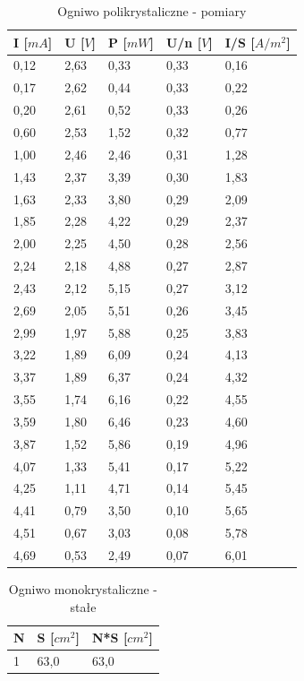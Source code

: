 \documentclass[12pt,a4paper]{article}
\begin{document}
\begin{table}[H]
\centering
\caption{Ogniwo polikrystaliczne - pomiary}
\label{poliwyniki}
\begin{tabular}{|p{2cm}|p{2cm}|p{2cm}|p{2cm}|p{2cm}|}
\hline
I {[}$mA${]} & U {[}$V${]} & P  {[}$mW${]} & U/n {[}$V${]} & I/S {[}$A/m^2${]} \\
\hline
0,12 & 2,63 & 0,33 & 0,33 & 0,16 \\
0,17 & 2,62 & 0,44 & 0,33 & 0,22 \\
0,20 & 2,61 & 0,52 & 0,33 & 0,26 \\
0,60 & 2,53 & 1,52 & 0,32 & 0,77 \\
1,00 & 2,46 & 2,46 & 0,31 & 1,28 \\
1,43 & 2,37 & 3,39 & 0,30 & 1,83 \\
1,63 & 2,33 & 3,80 & 0,29 & 2,09 \\
1,85 & 2,28 & 4,22 & 0,29 & 2,37 \\
2,00 & 2,25 & 4,50 & 0,28 & 2,56 \\
2,24 & 2,18 & 4,88 & 0,27 & 2,87 \\
2,43 & 2,12 & 5,15 & 0,27 & 3,12 \\
2,69 & 2,05 & 5,51 & 0,26 & 3,45 \\
2,99 & 1,97 & 5,88 & 0,25 & 3,83 \\
3,22 & 1,89 & 6,09 & 0,24 & 4,13 \\
3,37 & 1,89 & 6,37 & 0,24 & 4,32 \\
3,55 & 1,74 & 6,16 & 0,22 & 4,55 \\
3,59 & 1,80 & 6,46 & 0,23 & 4,60 \\
3,87 & 1,52 & 5,86 & 0,19 & 4,96 \\
4,07 & 1,33 & 5,41 & 0,17 & 5,22 \\
4,25 & 1,11 & 4,71 & 0,14 & 5,45 \\
4,41 & 0,79 & 3,50 & 0,10 & 5,65 \\
4,51 & 0,67 & 3,03 & 0,08 & 5,78 \\
4,69 & 0,53 & 2,49 & 0,07 & 6,01\\
\hline
\end{tabular}
\end{table}

\newpage

\begin{table}[H]
\centering
\caption{Ogniwo monokrystaliczne - stałe}
\label{monostale}
\begin{tabular}{|p{2cm}|p{2cm}|p{2cm}|}
\hline
N & S {[}$cm^2${]} & N*S {[}$cm^2${]}   \\
\hline
1 & 63,0 & 63,0 \\
\hline
\end{tabular}
\end{table}
\end{document}
